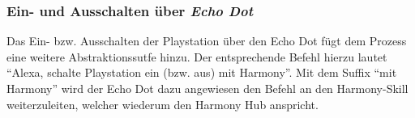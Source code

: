 \subsubsection{Ein- und Ausschalten über \textit{Echo Dot}}
Das Ein- bzw. Ausschalten der Playstation über den Echo Dot fügt dem Prozess eine weitere Abstraktionssutfe hinzu.
Der entsprechende Befehl hierzu lautet \enquote{Alexa, schalte Playstation ein (bzw. aus) mit Harmony}.
Mit dem Suffix \enquote{mit Harmony} wird der Echo Dot dazu angewiesen den Befehl an den Harmony-Skill weiterzuleiten,
welcher wiederum den Harmony Hub anspricht.